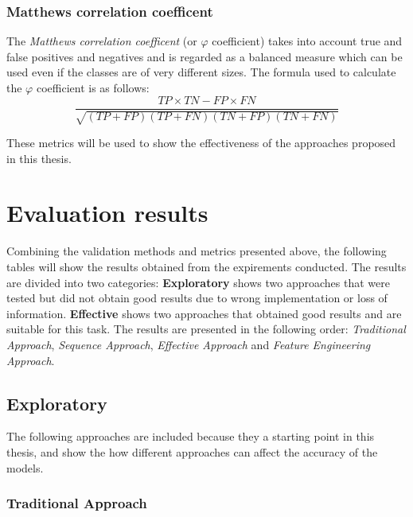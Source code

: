            \subsubsection{Matthews correlation coefficent} 

                The \textit{Matthews correlation coefficent} (or $\varphi$ coefficient) takes into account true and false positives and negatives and is regarded as a balanced measure which can be used even if the classes are of very different sizes. The formula used to calculate the $\varphi$ coefficient is as follows: 
                \begin{equation}
                    \frac{TP \times TN - FP \times FN}{\sqrt{(TP + FP)(TP + FN)(TN + FP)(TN + FN)}}
                \end{equation}

            These metrics will be used to show the effectiveness of the approaches proposed in this thesis.
    
\section{Evaluation results}
        
        Combining the validation methods and metrics presented above, the following tables will show the results obtained from the expirements conducted. The results are divided into two categories: \textbf{Exploratory} shows two approaches that were tested but did not obtain good results due to wrong implementation or loss of information. \textbf{Effective} shows two approaches that obtained good results and are suitable for this task. The results are presented in the following order: \textit{Traditional Approach}, \textit{Sequence Approach}, \textit{Effective Approach} and \textit{Feature Engineering Approach}. 

        \subsection{Exploratory}

            The following approaches are included because they a starting point in this thesis, and show the how different approaches can affect the accuracy of the models.
            
            \subsubsection{Traditional Approach}
                
